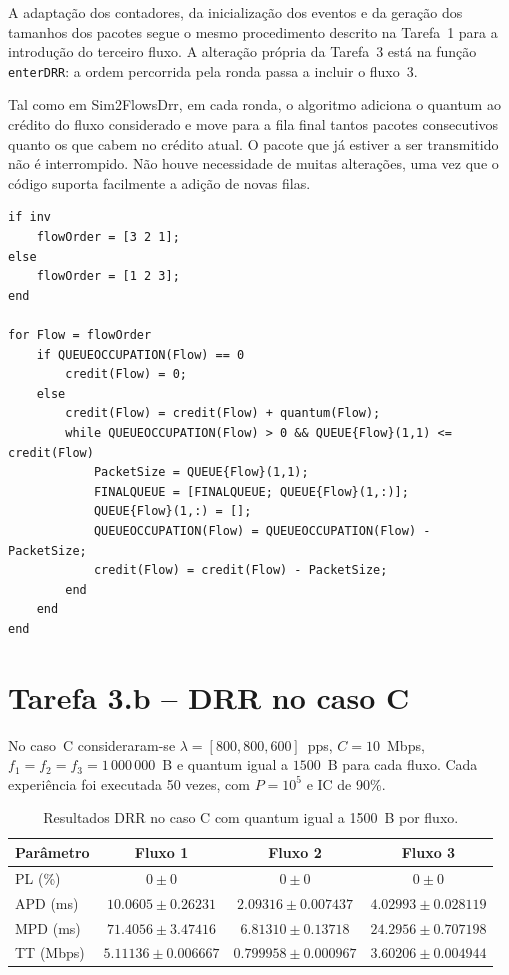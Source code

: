 \documentclass[11pt,a4paper]{article}
\begin{document}
A adaptação dos contadores, da inicialização dos eventos e da geração dos
tamanhos dos pacotes segue o mesmo procedimento descrito na Tarefa~1 para a
introdução do terceiro fluxo. A alteração própria da Tarefa~3 está na função
\texttt{enterDRR}: a
ordem percorrida pela ronda passa a incluir o fluxo~3.

Tal como em Sim2FlowsDrr, em cada ronda, o algoritmo adiciona o quantum ao crédito do fluxo considerado
e move para a fila final tantos pacotes consecutivos quanto os que cabem no
crédito atual. O pacote que já estiver a ser transmitido não é interrompido.
Não houve necessidade de muitas alterações, uma vez que o código suporta
facilmente a adição de novas filas.

\begin{lstlisting}[basicstyle=\ttfamily\scriptsize]
if inv
    flowOrder = [3 2 1];
else
    flowOrder = [1 2 3];
end

for Flow = flowOrder
    if QUEUEOCCUPATION(Flow) == 0
        credit(Flow) = 0;
    else
        credit(Flow) = credit(Flow) + quantum(Flow);
        while QUEUEOCCUPATION(Flow) > 0 && QUEUE{Flow}(1,1) <= credit(Flow)
            PacketSize = QUEUE{Flow}(1,1);
            FINALQUEUE = [FINALQUEUE; QUEUE{Flow}(1,:)];
            QUEUE{Flow}(1,:) = [];
            QUEUEOCCUPATION(Flow) = QUEUEOCCUPATION(Flow) - PacketSize;
            credit(Flow) = credit(Flow) - PacketSize;
        end
    end
end
\end{lstlisting}
\newpage
\section{Tarefa 3.b -- DRR no caso C}

No caso~C consideraram-se
$\lambda=[800,800,600]$~pps, $C=10$~Mbps,
$f_1=f_2=f_3=1\,000\,000$~B e quantum igual a $1500$~B para cada fluxo.
Cada experiência foi executada 50 vezes, com $P=10^5$ e IC de 90\%.

\begin{table}[htbp]
    \centering
    \caption{Resultados DRR no caso C com quantum igual a 1500~B por fluxo.}
    \label{tab:3b}
    \begin{tabular}{lccc}
        \toprule
        Parâmetro & Fluxo 1 & Fluxo 2 & Fluxo 3 \\
        \midrule
        PL (\%) & $0 \pm 0$ & $0 \pm 0$ & $0 \pm 0$ \\
        APD (ms) & $10.0605 \pm 0.26231$ &
                   $2.09316 \pm 0.007437$ &
                   $4.02993 \pm 0.028119$ \\
        MPD (ms) & $71.4056 \pm 3.47416$ &
                   $6.81310 \pm 0.13718$ &
                   $24.2956 \pm 0.707198$ \\
        TT (Mbps) & $5.11136 \pm 0.006667$ &
                    $0.799958 \pm 0.000967$ &
                    $3.60206 \pm 0.004944$ \\
        \bottomrule
    \end{tabular}
\end{table}
\end{document}
